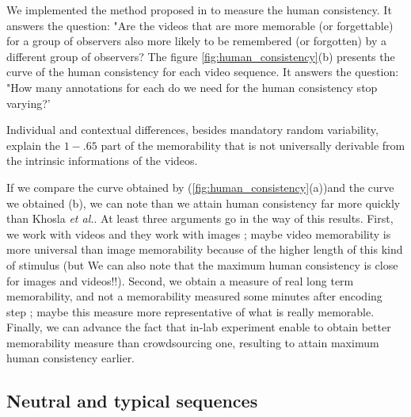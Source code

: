 \documentclass[sigconf]{acmart}
\begin{document}

We implemented the method proposed in \cite{isola_2014_makes} to measure the human consistency. It answers the question: "Are the videos that are more memorable (or forgettable) for a group of observers also more likely to be remembered (or forgotten) by a different group of observers? The figure \ref{fig:human_consistency}(b) presents the curve of the human consistency for each video sequence. It answers the question: "How many annotations for each do we need for the human consistency stop varying?'







Individual and contextual differences, besides mandatory random variability, explain the $1-.65$ part of the memorability that is not universally derivable from the intrinsic informations of the videos.  

If we compare the curve obtained by \cite{khosla_2015_understanding} (\ref{fig:human_consistency}(a))and the curve we obtained (b), we can note than we attain human consistency far more quickly than Khosla \textit{et al.}. At least three arguments go in the way of this results. First, we work with videos and they work with images ; maybe video memorability is more universal than image memorability because of the higher length of this kind of stimulus (but We can also note that the maximum human consistency is close for images and videos!!). Second, we obtain a measure of real long term memorability, and not a memorability measured some minutes after encoding step ; maybe this measure more representative of what is really memorable. Finally, we can advance the fact that in-lab experiment enable to obtain better memorability measure than crowdsourcing one, resulting to attain maximum human consistency earlier.

\subsection{Neutral and typical sequences}
\end{document}
